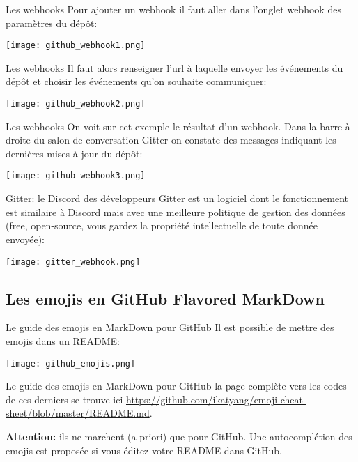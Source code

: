 \documentclass{beamer}
\begin{document}
\begin{frame}{Les webhooks}
Pour ajouter un webhook il faut aller dans l'onglet webhook des paramètres du dépôt:\\
\medskip
\begin{center}
	\texttt{[image: github\_webhook1.png]}
\end{center}
\end{frame}

\begin{frame}{Les webhooks}
Il faut alors renseigner l'url à laquelle envoyer les événements du dépôt et choisir les événements qu'on souhaite communiquer:\\
\medskip
\begin{center}
	\texttt{[image: github\_webhook2.png]}
\end{center}
\end{frame}

\begin{frame}{Les webhooks}
On voit sur cet exemple le résultat d'un webhook. Dans la barre à droite du salon de conversation Gitter on constate des messages indiquant les dernières mises à jour du dépôt:\\
\medskip
\begin{center}
	\texttt{[image: github\_webhook3.png]}
\end{center}
\end{frame}

\begin{frame}{Gitter: le Discord des développeurs}
Gitter est un logiciel dont le fonctionnement est similaire à Discord mais avec une meilleure politique de gestion des données (free, open-source, vous gardez la propriété intellectuelle de toute donnée envoyée):\\
\medskip
\begin{center}
	\texttt{[image: gitter\_webhook.png]}
\end{center}
\end{frame}



\subsection{Les emojis en GitHub Flavored MarkDown}
\begin{frame}{Le guide des emojis en MarkDown pour GitHub}
Il est possible de mettre des emojis dans un README: 
\begin{center}
	\texttt{[image: github\_emojis.png]}
\end{center}
\end{frame}

\begin{frame}{Le guide des emojis en MarkDown pour GitHub}
la page complète vers les codes de ces-derniers se trouve ici \url{https://github.com/ikatyang/emoji-cheat-sheet/blob/master/README.md}.\\
\medskip
 
\textbf{Attention:} ils ne marchent (a priori) que pour GitHub. Une autocomplétion des emojis est proposée si vous éditez votre README dans GitHub.
\end{frame}
\end{document}
